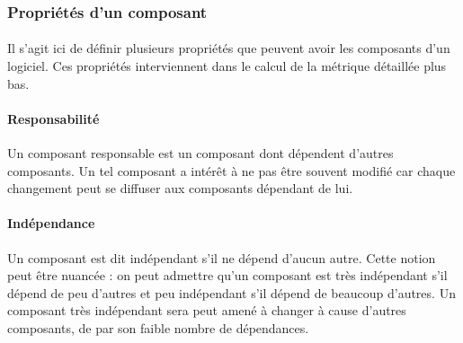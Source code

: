\documentclass{scrartcl}
\begin{document}
\subsubsection{Propriétés d'un composant}
\label{componentProperties}

    \paragraph{}Il s'agit ici de définir plusieurs propriétés que peuvent avoir les composants d'un logiciel. Ces propriétés interviennent dans le calcul de la métrique détaillée plus bas.
    
    \paragraph{Responsabilité}Un composant responsable est un composant dont dépendent d'autres composants. Un tel composant a intérêt à ne pas être souvent modifié car chaque changement peut se diffuser aux composants dépendant de lui.
    
    \paragraph{Indépendance}Un composant est dit indépendant s'il ne dépend d'aucun autre. Cette notion peut être nuancée : on peut admettre qu'un composant est très indépendant s'il dépend de peu d'autres et peu indépendant s'il dépend de beaucoup d'autres. Un composant très indépendant sera peut amené à changer à cause d'autres composants, de par son faible nombre de dépendances.
    
\end{document}
